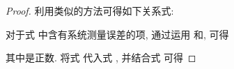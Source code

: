 \begin{proof}
\begin{comment}
             &=-\underline{\alpha}\mathrm{E}\Big\{ e^{\top}(t)[P(u)L(u)\otimes G\Gamma]e(t)\Big\}.
            \end{comment}
        利用类似的方法可得如下关系式:
            \begin{comment}\label{equ:3}
            -\mathrm{E}\Big\{e^{\top}(t)[P(u)D(u)\otimes G\Gamma]H(e(t))\Big\}\leq-\underline{\alpha} \mathrm{E}\Big\{e^{\top}(t)[P(u)D(u)\otimes G\Gamma]e(t)\Big\}.
            \end{comment}
        对于式  中含有系统测量误差的项, 通过运用 和, 可得
            \begin{comment}\label{equ:4}
            \nonumber \mathrm{E}\Big\{e^{\top}(t)[P(u)\otimes G]\tilde{e}(t)\Big\}&\leq \mathrm{E}\Big\{\frac{\mu}{2}e^{\top}(t)[P(u)\otimes G]^2e(t)+\frac{1}{2\mu}\tilde{e}^{\top}(t)\tilde{e}(t)\Big\}\\
            &\leq \mathrm{E}\Big\{\frac{\mu\bar{\varepsilon}^2}{2}e^{\top}(t)e(t)+\frac{1}{2\mu}\tilde{e}^{\top}(t)\tilde{e}(t)\Big\},
            \end{comment}
            其中是正数. 将式  代入式 , 并结合式  可得
            \begin{comment}\label{equ:5}
            \nonumber \mathrm{E}\mathcal{L}V(t)&\leq \mathrm{E}\Big\{e^{\top}(t)\Big[\bar{\delta}P(u)\otimes G-c\theta\underline{\alpha} P(u)L(u)\otimes G\Gamma\\
            \nonumber &\quad-c\tau\underline{\alpha} P(u)D(u)\otimes G\Gamma+\frac{1}{2}\sum_{v=1}^{m}q_{uv}P(v)\otimes G\Big]e(t)\\
            \nonumber &\quad+(\frac{c\mu\bar{\varepsilon}^2}{2}+\frac{\delta\bar{\varepsilon}}{2}-\xi\underline{\varepsilon}) e^{\top}(t)e(t)
            +\frac{1}{2\mu}\tilde{e}^{\top}(t)\tilde{e}(t)-\frac{\delta\bar{\varepsilon}}{2}e^{\top}(t)e(t)\Big\}\\
            &\leq \mathrm{E}\Big\{(\frac{c\bar{\varepsilon}^2\mu}{2}-c\bar{\varepsilon}\omega)e^\top(t)e(t)+\frac{c\bar{\varepsilon}}{2\omega}\tilde{e}^{\top}(t)\tilde{e}(t)\Big\}
            -\delta EV(t,e(t)).
            \end{comment}


\end{proof}
